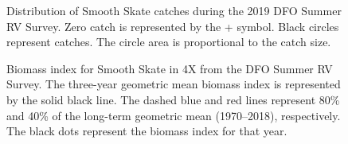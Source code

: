 \documentclass[11pt]{book}
\begin{document}
\begin{figure}[htb]

{\centering {} 

}

\caption{Distribution of Smooth Skate catches during the 2019 DFO Summer RV Survey. Zero catch is represented by the + symbol. Black circles represent catches. The circle area is proportional to the catch size.}\label{fig:100-map-smoothskate}
\end{figure}

\begin{figure}[htb]

{\centering {} 

}

\caption{Biomass index for Smooth Skate in 4X from the DFO Summer RV Survey. The three-year geometric mean biomass index is represented by the solid black line. The dashed blue and red lines represent 80\% and 40\% of the long-term geometric mean (1970--2018), respectively. The black dots represent the biomass index for that year.}\label{fig:101-fig-smoothskate-biomass4X}
\end{figure}
\end{document}
